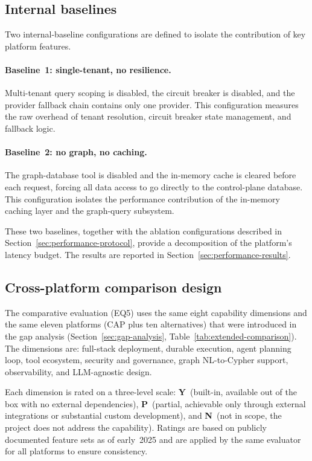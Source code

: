 \documentclass[a4paper,noexaminfo]{sapthesis}
\begin{document}
\subsection{Internal baselines}

Two internal-baseline configurations are defined to isolate the
contribution of key platform features.

\paragraph{Baseline~1: single-tenant, no resilience.}
Multi-tenant query scoping is disabled, the circuit breaker is disabled,
and the provider fallback chain contains only one provider.  This
configuration measures the raw overhead of tenant resolution, circuit
breaker state management, and fallback logic.

\paragraph{Baseline~2: no graph, no caching.}
The graph-database tool is disabled and the in-memory cache is cleared
before each request, forcing all data access to go directly to the
control-plane database.  This configuration isolates the performance
contribution of the in-memory caching layer and the graph-query subsystem.

These two baselines, together with the ablation configurations described
in Section~\ref{sec:performance-protocol}, provide a decomposition of
the platform's latency budget.  The results are reported in
Section~\ref{sec:performance-results}.

\subsection{Cross-platform comparison design}

The comparative evaluation (EQ5) uses the same eight capability dimensions
and the same eleven platforms (CAP plus ten alternatives) that were
introduced in the gap analysis (Section~\ref{sec:gap-analysis},
Table~\ref{tab:extended-comparison}).  The dimensions are: full-stack
deployment, durable execution, agent planning loop, tool ecosystem,
security and governance, graph NL-to-Cypher support, observability, and
LLM-agnostic design.

Each dimension is rated on a three-level scale:
\textbf{Y}~(built-in, available out of the box with no external
dependencies), \textbf{P}~(partial, achievable only through external
integrations or substantial custom development), and
\textbf{N}~(not in scope, the project does not address the capability).
Ratings are based on publicly documented feature sets as of early~2025
and are applied by the same evaluator for all platforms to ensure
consistency.
\end{document}
